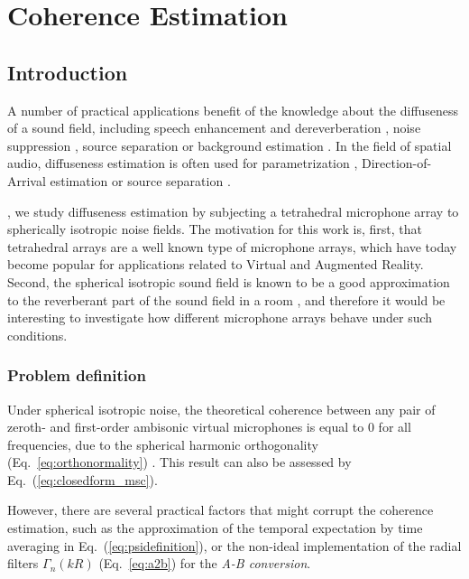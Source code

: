 \chapter{Coherence Estimation}
\label{chap:coherence}


\section{Introduction}

A number of practical applications benefit of the knowledge about the diffuseness of a sound field, including speech enhancement and dereverberation \cite{p_habets_dual-microphone_2006}, noise suppression \cite{ito_designing_2010}, source separation \cite{duong_under-determined_2009} or background estimation \cite{stefanakis_foreground_2015}. In the field of spatial audio, diffuseness estimation is often used for parametrization \cite{pulkki2006directional, politis_compass_2018}, Direction-of-Arrival estimation \cite{thiergart_localization_2009} or source separation \cite{motlicek_real-time_2013}.

, we study diffuseness estimation by subjecting a tetrahedral microphone array to spherically isotropic noise fields.
The motivation for this work is, first, that tetrahedral arrays are a well known type of microphone arrays, which have today become popular for applications related to Virtual and Augmented Reality. 
Second, the spherical isotropic sound field is known to be a good approximation to the reverberant part of the sound field in a room \cite{elko_spatial_2001, mccowan_microphone_2003}, and therefore it would be interesting to investigate how different microphone arrays behave under such conditions.




\subsection{Problem definition}

Under spherical isotropic noise, the theoretical coherence between any pair of zeroth- and first-order ambisonic virtual microphones is equal to 0 for all frequencies, due to the spherical harmonic orthogonality (Eq.~\ref{eq:orthonormality}) \cite{elko_spatial_2001}. This result can also be assessed by Eq.~(\ref{eq:closedform_msc}).

However, there are several practical factors that might corrupt the coherence estimation, such as the approximation of the temporal expectation by time averaging \cite{thiergart_diffuseness_2011} in Eq.~(\ref{eq:psidefinition}), or the non-ideal implementation of the radial filters $\Gamma_n(kR)$ (Eq.~\ref{eq:a2b}) for the \textit{A-B conversion}\cite{schorkhuber_ambisonic_2017}.

